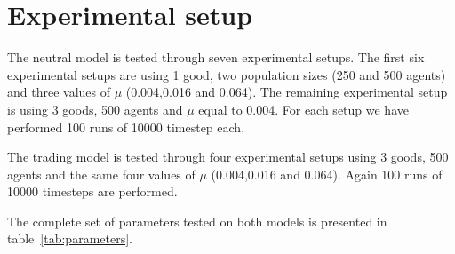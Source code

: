 \documentclass{wscpaperproc}
\begin{document}
\section{Experimental setup}
%

The neutral model is tested through seven experimental setups. The first six experimental setups are using 1 good, two population sizes (250 and 500 agents) and three values of $\mu$ (0.004,0.016 and 0.064). The remaining experimental setup is using 3 goods, 500 agents and $\mu$ equal to 0.004. For each setup we have performed 100 runs of 10000 timestep each. 

The trading model is tested through four experimental setups using 3 goods, 500 agents and the same four values of $\mu$ (0.004,0.016 and 0.064). Again 100 runs of 10000 timesteps are performed.

The complete set of parameters tested on both models is presented in table~\ref{tab:parameters}. 
\end{document}
